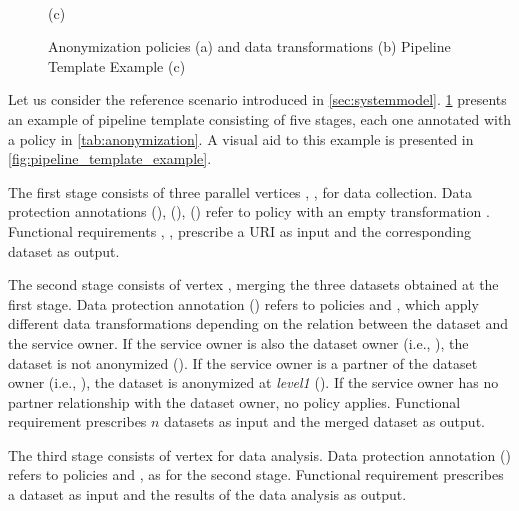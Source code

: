 \begin{figure}[ht!]
{
  }
  \\
  \footnotesize(c)
  \caption{Anonymization policies (a) and data transformations (b) Pipeline Template Example (c)}\label{tab:anonymization}
  \label{fig:service_composition_template}
\end{figure}

\begin{example}[\bf \pipelineTemplate]\label{ex:template}
  Let us consider the reference scenario introduced in \cref{sec:systemmodel}.
  \cref{fig:service_composition_template} presents an example of pipeline template consisting of five stages, each one annotated with a policy in \cref{tab:anonymization}.
  {\color{OurColor}A visual aid to this example is presented in \cref{fig:pipeline_template_example}}.

  The first stage consists of three parallel vertices , ,  for data collection.
  Data protection annotations \myLambda(), \myLambda(), \myLambda() refer to policy  with an empty transformation .
  Functional requirements , ,   prescribe a URI as input and the corresponding dataset as output.

  The second stage consists of vertex , merging the three datasets obtained at the first stage. Data protection annotation \myLambda() refers to policies  and , which apply different data transformations depending on the relation between the dataset and the service owner.
  If the service owner is also the dataset owner (i.e., \pone), the dataset is not anonymized (). If the service owner is a partner of the dataset owner (i.e., \ptwo), the dataset is anonymized at \emph{level1} (). If the service owner has no partner relationship with the dataset owner, no policy applies.
  Functional requirement  prescribes $n$ datasets as input and the merged dataset as output.

  The third stage consists of vertex   for data analysis.
  Data protection annotation \myLambda() refers to policies  and , as for the second stage.
  Functional requirement  prescribes a dataset as input and the results of the data analysis as output.


\end{example}
